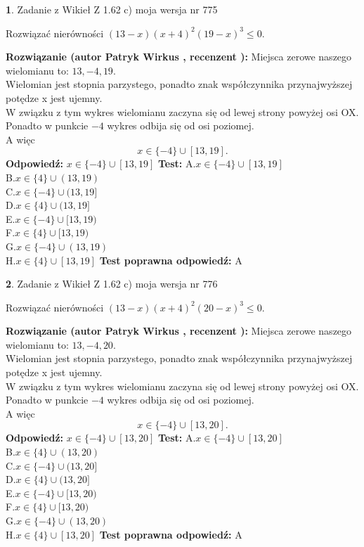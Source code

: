 \documentclass[12pt, a4paper]{article}
\theoremstyle{definition} %
\newtheorem{zad}{}
\newcommand{\zadStart}[1]{\begin{zad}#1\newline}
\newcommand{\zadStop}{\end{zad}}
\newcommand{\rozwStart}[2]{\noindent \textbf{Rozwiązanie (autor #1 , recenzent #2): }\newline}
\newcommand{\rozwStop}{\newline}
\newcommand{\odpStart}{\noindent \textbf{Odpowiedź:}\newline}
\newcommand{\odpStop}{\newline}
\newcommand{\testStart}{\noindent \textbf{Test:}\newline}
\newcommand{\testStop}{\newline}
\newcommand{\kluczStart}{\noindent \textbf{Test poprawna odpowiedź:}\newline}
\newcommand{\kluczStop}{\newline}
\begin{document}
\zadStart{Zadanie z Wikieł Z 1.62 c) moja wersja nr 775}

Rozwiązać nierówności $(13-x)(x+4)^{2}(19-x)^{3}\le0$.
\zadStop
\rozwStart{Patryk Wirkus}{}
Miejsca zerowe naszego wielomianu to: $13, -4, 19$.\\
Wielomian jest stopnia parzystego, ponadto znak współczynnika przy\linebreak najwyższej potędze x jest ujemny.\\ W związku z tym wykres wielomianu zaczyna się od lewej strony powyżej osi OX.\\
Ponadto w punkcie $-4$ wykres odbija się od osi poziomej.\\
A więc $$x \in \{-4\} \cup [13,19].$$
\rozwStop
\odpStart
$x \in \{-4\} \cup [13,19]$
\odpStop
\testStart
A.$x \in \{-4\} \cup [13,19]$\\
B.$x \in \{4\} \cup (13,19)$\\
C.$x \in \{-4\} \cup (13,19]$\\
D.$x \in \{4\} \cup (13,19]$\\
E.$x \in \{-4\} \cup [13,19)$\\
F.$x \in \{4\} \cup [13,19)$\\
G.$x \in \{-4\} \cup (13,19)$\\
H.$x \in \{4\} \cup [13,19]$
\testStop
\kluczStart
A
\kluczStop



\zadStart{Zadanie z Wikieł Z 1.62 c) moja wersja nr 776}

Rozwiązać nierówności $(13-x)(x+4)^{2}(20-x)^{3}\le0$.
\zadStop
\rozwStart{Patryk Wirkus}{}
Miejsca zerowe naszego wielomianu to: $13, -4, 20$.\\
Wielomian jest stopnia parzystego, ponadto znak współczynnika przy\linebreak najwyższej potędze x jest ujemny.\\ W związku z tym wykres wielomianu zaczyna się od lewej strony powyżej osi OX.\\
Ponadto w punkcie $-4$ wykres odbija się od osi poziomej.\\
A więc $$x \in \{-4\} \cup [13,20].$$
\rozwStop
\odpStart
$x \in \{-4\} \cup [13,20]$
\odpStop
\testStart
A.$x \in \{-4\} \cup [13,20]$\\
B.$x \in \{4\} \cup (13,20)$\\
C.$x \in \{-4\} \cup (13,20]$\\
D.$x \in \{4\} \cup (13,20]$\\
E.$x \in \{-4\} \cup [13,20)$\\
F.$x \in \{4\} \cup [13,20)$\\
G.$x \in \{-4\} \cup (13,20)$\\
H.$x \in \{4\} \cup [13,20]$
\testStop
\kluczStart
A
\kluczStop
\end{document}
